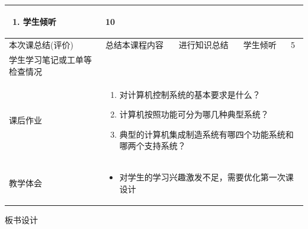 {\begin{landscape}
\begin{longtable}{|m{10mm}|m{50mm}|m{50mm}|m{50mm}|m{15mm}|}
\begin{enumerate}
\item 学生倾听
\end{enumerate} &10 \\\hline
\centering 本次课总结(评价)&总结本课程内容 &进行知识总结 &学生倾听 &5 \\\hline
\centering 学生学习笔记或工单等检查情况&\multicolumn{4}{m{165mm}|}{\quad}\\\hline
\centering 课后作业&\multicolumn{4}{m{165mm}|}{\begin{enumerate}
\item 对计算机控制系统的基本要求是什么？
\item 计算机按照功能可分为哪几种典型系统？
\item 典型的计算机集成制造系统有哪四个功能系统和哪两个支持系统？
\end{enumerate}}\\\hline
\centering 教学体会&\multicolumn{4}{m{165mm}|}{\begin{itemize}
\item 对学生的学习兴趣激发不足，需要优化第一次课设计
\end{itemize}}
\end{longtable}

\end{landscape}
\clearpage
\begin{center}
{\huge 板书设计}
\end{center}
}

